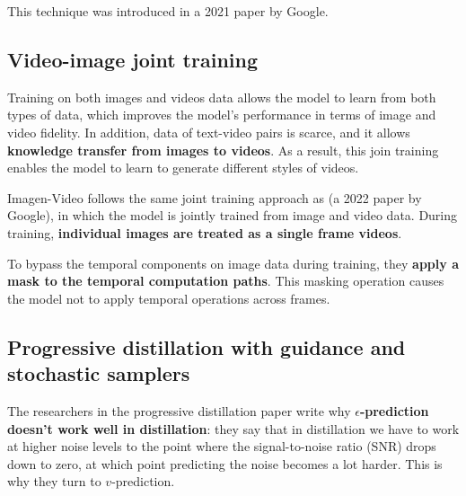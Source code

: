 This technique was introduced in a 2021 paper \cite{cascaded_diffusion_models} by Google.











\subsection{Video-image joint training}

Training on both images and videos data allows the model to learn from both types of data, which improves the model's performance in terms of image and video fidelity. In addition, data of text-video pairs is scarce, and it allows \textbf{knowledge transfer from images to videos}. As a result, this join training enables the model to learn to generate different styles of videos.

Imagen-Video follows the same joint training approach as \cite{video_diffusion_models} (a 2022 paper by Google), in which the model is jointly trained from image and video data. During training, \textbf{individual images are treated as a single frame videos}.

To bypass the temporal components on image data during training, they \textbf{apply a mask to the temporal computation paths}. This masking operation causes the model not to apply temporal operations across frames.











\subsection{Progressive distillation with guidance and stochastic samplers}

The researchers in the progressive distillation paper \cite{v_prediction} write why \textbf{$\epsilon$-prediction doesn't work well in distillation}: they say that in distillation we have to work at higher noise levels to the point where the signal-to-noise ratio (SNR) drops down to zero, at which point predicting the noise becomes a lot harder. This is why they turn to $v$-prediction.

